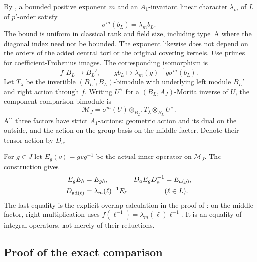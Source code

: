 By \cite[Lemmas~9.3 and~9.6]{OpenAIFieldDonovan2026}, a bounded
positive exponent $m$ and an $A_1$-invariant linear character
$\lambda_m$ of $L$ of $p'$-order satisfy
\[
 \sigma^m(b_L)=\lambda_m b_L.
\]
The bound is uniform in classical rank and field size, including
type~A where the diagonal index need not be bounded.  The exponent
likewise does not depend on the orders of the
added central tori or the original covering kernels.
Use primes for coefficient-Frobenius images.  The corresponding
isomorphism is
\[
 f:B_L\longrightarrow B_L',\qquad
 g b_L\longmapsto\lambda_m(g)^{-1}g\sigma^m(b_L).
\]
Let $T_{\lambda}$ be the invertible $(B_L',B_L)$-bimodule with
underlying left module $B_L'$ and right action through $f$.
Writing $U^\vee$ for a $(B_L,A_J)$-Morita inverse of $U$, the
component comparison bimodule is
\begin{equation}\label{eq:comparison-bimodule}
 \mathcal M_J=
 \sigma^m(U)\otimes_{B_L'}T_{\lambda}\otimes_{B_L}U^\vee.
\end{equation}
All three factors have strict $A_1$-actions: geometric action and
its dual on the outside, and the action on the group basis on
the middle factor.  Denote their tensor action by $D_a$.

For $g\in J$ let $E_g(v)=gvg^{-1}$ be the actual inner
operator on $\mathcal M_J$.  The construction gives
\begin{align}
 E_gE_h&=E_{gh},& D_aE_gD_a^{-1}&=E_{a(g)},
       \label{eq:strict-operators}\\
 D_{\operatorname{ad}(\ell)}&=\lambda_m(\ell)^{-1}E_\ell
       &&(\ell\in L).
       \label{eq:overlap}
\end{align}
The last equality is the explicit overlap calculation in the
proof of \cite[Lemma~9.7]{OpenAIFieldDonovan2026}: on the middle
factor, right multiplication uses
$f(\ell^{-1})=\lambda_m(\ell)\ell^{-1}$.  It is an equality of
integral operators, not merely of their reductions.

\subsection{Proof of the exact comparison}


